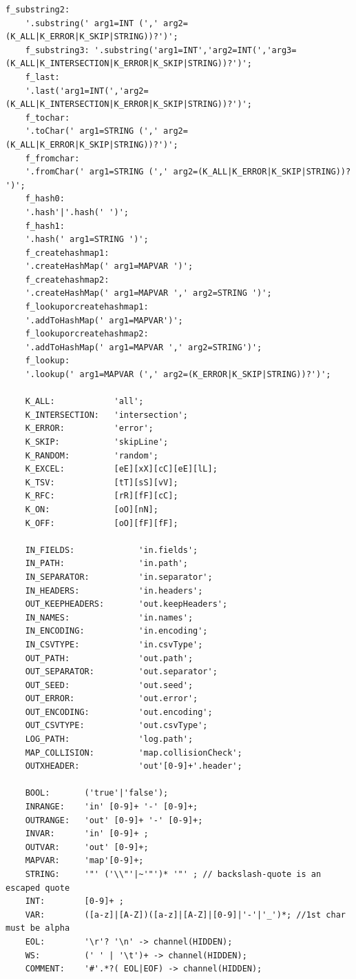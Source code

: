 \documentclass[12pt]{report}
\begin{document}
\begin{lstlisting}[style=py, gobble=1]
	f_substring2:   			     
	'.substring(' arg1=INT (',' arg2=(K_ALL|K_ERROR|K_SKIP|STRING))?')';
	f_substring3: '.substring('arg1=INT','arg2=INT(','arg3=(K_ALL|K_INTERSECTION|K_ERROR|K_SKIP|STRING))?')';
	f_last:         			     
	'.last('arg1=INT(','arg2=(K_ALL|K_INTERSECTION|K_ERROR|K_SKIP|STRING))?')';
	f_tochar:      				     
	'.toChar(' arg1=STRING (',' arg2=(K_ALL|K_ERROR|K_SKIP|STRING))?')';
	f_fromchar:    				     
	'.fromChar(' arg1=STRING (',' arg2=(K_ALL|K_ERROR|K_SKIP|STRING))? ')';
	f_hash0:        			     
	'.hash'|'.hash(' ')';
	f_hash1:        			     
	'.hash(' arg1=STRING ')';
	f_createhashmap1:			     
	'.createHashMap(' arg1=MAPVAR ')';
	f_createhashmap2:			     
	'.createHashMap(' arg1=MAPVAR ',' arg2=STRING ')';
	f_lookuporcreatehashmap1:	 
	'.addToHashMap(' arg1=MAPVAR')';
	f_lookuporcreatehashmap2:	 
	'.addToHashMap(' arg1=MAPVAR ',' arg2=STRING')'; 
	f_lookup:					         
	'.lookup(' arg1=MAPVAR (',' arg2=(K_ERROR|K_SKIP|STRING))?')';
	
	K_ALL:            'all';
	K_INTERSECTION:   'intersection';
	K_ERROR:          'error';
	K_SKIP:           'skipLine';
	K_RANDOM:         'random';
	K_EXCEL:          [eE][xX][cC][eE][lL];
	K_TSV:            [tT][sS][vV];
	K_RFC:            [rR][fF][cC];
	K_ON:             [oO][nN];
	K_OFF:            [oO][fF][fF];
	
	IN_FIELDS:             'in.fields';
	IN_PATH:               'in.path';
	IN_SEPARATOR:          'in.separator';
	IN_HEADERS:            'in.headers';
	OUT_KEEPHEADERS:       'out.keepHeaders';
	IN_NAMES:              'in.names';
	IN_ENCODING:           'in.encoding';
	IN_CSVTYPE:            'in.csvType';
	OUT_PATH:              'out.path';
	OUT_SEPARATOR:         'out.separator';
	OUT_SEED:              'out.seed';
	OUT_ERROR:             'out.error';
	OUT_ENCODING:          'out.encoding';
	OUT_CSVTYPE:           'out.csvType';
	LOG_PATH:              'log.path';
	MAP_COLLISION:         'map.collisionCheck';
	OUTXHEADER:            'out'[0-9]+'.header';
	
	BOOL:       ('true'|'false');
	INRANGE:    'in' [0-9]+ '-' [0-9]+;
	OUTRANGE:   'out' [0-9]+ '-' [0-9]+;
	INVAR:      'in' [0-9]+ ;
	OUTVAR:     'out' [0-9]+;
	MAPVAR:     'map'[0-9]+;
	STRING:     '"' ('\\"'|~'"')* '"' ; // backslash-quote is an escaped quote
	INT:        [0-9]+ ;
	VAR:        ([a-z]|[A-Z])([a-z]|[A-Z]|[0-9]|'-'|'_')*; //1st char must be alpha
	EOL:        '\r'? '\n' -> channel(HIDDEN);
	WS:         (' ' | '\t')+ -> channel(HIDDEN);
	COMMENT:    '#'.*?( EOL|EOF) -> channel(HIDDEN);
	\end{lstlisting}
	
\end{document}

